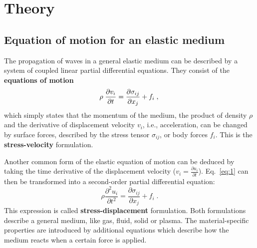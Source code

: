 \section{Theory}
\label{theory}

\subsection{Equation of motion for an elastic medium}
\label{ch:eq_motion_elastic}
The propagation of waves in a general elastic medium can be described by a system of coupled linear partial differential equations. They consist of the \textbf{equations of motion}
\begin{equation}
    \rho\;\frac{\partial v_i}{\partial t} = \frac{\partial \sigma_{ij}}{\partial x_j} + f_i\;,\\
    \label{eq:1}
\end{equation}
which simply states that the momentum of the medium, the product of density $\rho$ and the derivative of displacement velocity $v_i$, i.e., acceleration, can be changed by surface forces, described by the stress tensor $\sigma_{ij}$, or body forces $f_i$. This is the {\textbf{stress-velocity}} formulation. 

Another common form of the elastic equation of motion can be deduced by taking the time derivative of the displacement velocity ($v_i = \frac{\partial u_i}{\partial t}$). Eq.~\ref{eq:1} can then be transformed into a second-order partial differential equation:
\begin{equation}
    \rho \frac{\partial^2 u_i}{\partial t^2} = \frac{\partial \sigma_{ij}}{\partial x_j} + f_i\;.
    \label{eq:2}
\end{equation}  
This expression is called {\textbf{stress-displacement}} formulation. Both formulations describe a general medium, like gas, fluid, solid or plasma. The material-specific properties are introduced by additional equations which describe how the medium reacts when a certain force is applied. 

